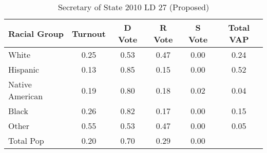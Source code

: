 \begin{table}[htb]
\begin{center}
\caption{Secretary of State 2010 LD 27 (Proposed)}
\label{sos10_vap_ld_27}
\begin{tabular}{lccccc}
  \hline
Racial Group & Turnout & D Vote & R Vote & S Vote & Total VAP \\ 
  \hline
White & 0.25 & 0.53 & 0.47 & 0.00 & 0.24 \\ 
  Hispanic & 0.13 & 0.85 & 0.15 & 0.00 & 0.52 \\ 
  Native American & 0.19 & 0.80 & 0.18 & 0.02 & 0.04 \\ 
  Black & 0.26 & 0.82 & 0.17 & 0.00 & 0.15 \\ 
  Other & 0.55 & 0.53 & 0.47 & 0.00 & 0.05 \\ 
  Total Pop & 0.20 & 0.70 & 0.29 & 0.00 &  \\ 
   \hline
\end{tabular}
\end{center}
\end{table}
